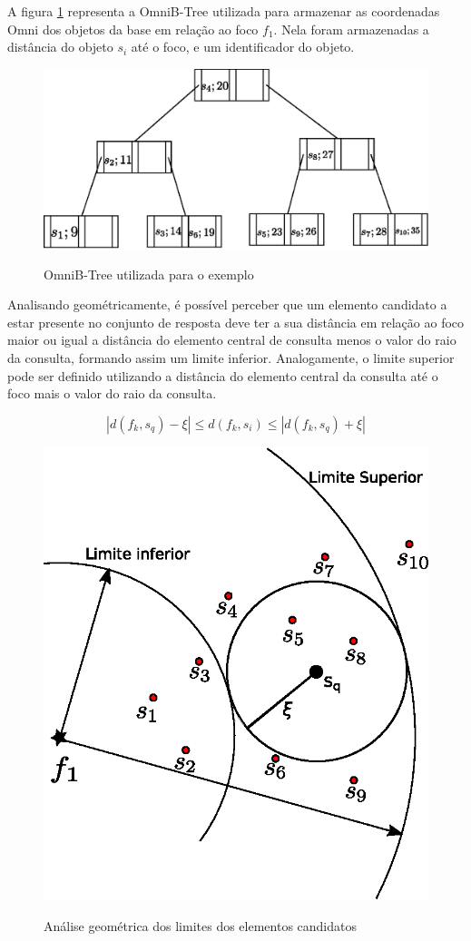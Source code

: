 A figura \ref{fig:btree} representa a OmniB-Tree utilizada para armazenar as coordenadas Omni dos objetos da base em relação ao foco $f_1$. Nela foram armazenadas
a distância do objeto $s_i$ até o foco, e um identificador do objeto.

\begin{figure}[H]
\centering
\caption{OmniB-Tree utilizada para o exemplo}
\includegraphics[width=.8\textwidth]{dados/figuras/btree.eps}
\label{fig:btree}
\end{figure}

Analisando geométricamente, é possível perceber que um elemento candidato a estar presente no conjunto de resposta deve ter a sua distância em relação ao foco maior ou igual a distância do elemento central de consulta menos o valor do
raio da consulta, formando assim um limite inferior. Analogamente, o limite superior pode ser definido utilizando a distância do elemento central da consulta até o foco mais o valor do raio da consulta.

\begin{equation} \label{eq:omnirq}
|d(f_k, s_q) - \xi| \leq d(f_k, s_i) \leq |d(f_k, s_q) + \xi|
\end{equation}

\begin{figure}[H]
\centering
\caption{Análise geométrica dos limites dos elementos candidatos}
\includegraphics[width=.55\textwidth]{dados/figuras/rg_ex2.eps}
\label{fig:rgex2}
\end{figure}

